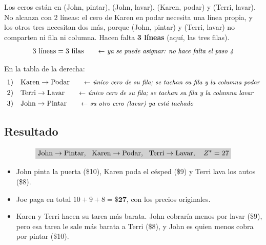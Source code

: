 \documentclass[11pt,a4paper]{article}
\let\pasobase\paso
\renewcommand{\paso}[1]{\needspace{7\baselineskip}\pasobase{#1}}
\newcommand{\marco}[3]{%
  \foreach \i in {2,...,#2} \foreach \j in {2,...,#3}
    \draw[gray!60, very thin] (#1-\i-\j.north west) rectangle (#1-\i-\j.south east);
  \draw[semithick] (#1-2-2.north west) rectangle (#1-#2-#3.south east);}
\newcommand{\tfila}[3]{\draw[tapa] (#1-#2-2.west) -- (#1-#2-#3.east);}
\newcommand{\pie}[2]{\node[below=1.5mm of #1, font=\scriptsize\itshape] {#2};}
\newcommand{\cero}[1]{\node[asig] at (#1) {};}
\newcommand{\flecha}[3]{\draw[-{Stealth[length=2.4mm]}, thick, shorten >=1mm] (#1.east) -- node[above, font=\scriptsize, align=center] {#3} (#1.east -| #2.west);}
\begin{document}
\begin{center}
\end{center}
Los ceros están en (John, pintar), (John, lavar), (Karen, podar) y (Terri, lavar). No alcanza con 2 líneas: el cero
de Karen en podar necesita una línea propia, y los otros tres necesitan dos más, porque (John, pintar) y
(Terri, lavar) no comparten ni fila ni columna. Hacen falta \textbf{3 líneas} (aquí, las tres filas).
\[
3 \text{ líneas} = 3 \text{ filas} \nota{ya se puede asignar: no hace falta el paso 4}
\]

En la tabla de la derecha:
\begin{align*}
1)\quad & \text{Karen} \to \text{Podar} \nota{único cero de su fila; se tachan su fila y la columna podar}\\
2)\quad & \text{Terri} \to \text{Lavar} \nota{único cero de su fila; se tachan su fila y la columna lavar}\\
3)\quad & \text{John} \to \text{Pintar} \nota{su otro cero (lavar) ya está tachado}
\end{align*}

\subsection*{Resultado}
\[
\res{\text{John} \to \text{Pintar},\ \ \text{Karen} \to \text{Podar},\ \ \text{Terri} \to \text{Lavar},\quad Z^* = 27}
\]
\begin{itemize}[itemsep=2pt]
  \item John pinta la puerta (\$10), Karen poda el césped (\$9) y Terri lava los autos (\$8).
  \item Joe paga en total $10 + 9 + 8 = \mathbf{\$27}$, con los precios originales.
  \item Karen y Terri hacen su tarea más barata. John cobraría menos por lavar (\$9), pero esa tarea le sale más
        barata a Terri (\$8), y John es quien menos cobra por pintar (\$10).
\end{itemize}
\end{document}
